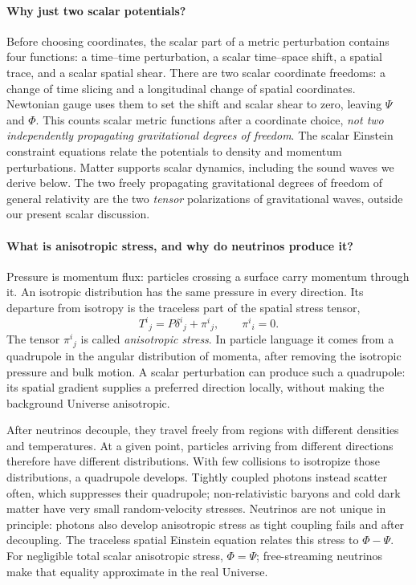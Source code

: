 \documentclass[12pt]{article}
\begin{document}
\paragraph{Why just two scalar potentials?}
Before choosing coordinates, the scalar part of a metric perturbation contains four
functions: a time--time perturbation, a scalar time--space shift, a spatial trace,
and a scalar spatial shear. There are two scalar coordinate freedoms: a change of
time slicing and a longitudinal change of spatial coordinates. Newtonian gauge uses
them to set the shift and scalar shear to zero, leaving $\Psi$ and $\Phi$.
This counts scalar metric functions after a coordinate choice, \emph{not two
independently propagating gravitational degrees of freedom}. The scalar Einstein
constraint equations relate the potentials to density and momentum perturbations.
Matter supports scalar dynamics, including the sound waves we derive below. The two
freely propagating gravitational degrees of freedom of general relativity are the
two \emph{tensor} polarizations of gravitational waves, outside our present scalar
discussion.

\paragraph{What is anisotropic stress, and why do neutrinos produce it?}
Pressure is momentum flux: particles crossing a surface carry momentum through it.
An isotropic distribution has the same pressure in every direction. Its departure
from isotropy is the traceless part of the spatial stress tensor,
\[
T^i{}_j=P\delta^i{}_j+\pi^i{}_j,\qquad \pi^i{}_i=0.
\]
The tensor $\pi^i{}_j$ is called \emph{anisotropic stress}. In particle language it
comes from a quadrupole in the angular distribution of momenta, after removing the
isotropic pressure and bulk motion. A scalar perturbation can produce such a
quadrupole: its spatial gradient supplies a preferred direction locally, without
making the background Universe anisotropic.

After neutrinos decouple, they travel freely from regions with different densities
and temperatures. At a given point, particles arriving from different directions
therefore have different distributions. With few collisions to isotropize those
distributions, a quadrupole develops. Tightly coupled photons instead scatter often,
which suppresses their quadrupole; non-relativistic baryons and cold dark matter
have very small random-velocity stresses. Neutrinos are not unique in principle:
photons also develop anisotropic stress as tight coupling fails and after decoupling.
The traceless spatial Einstein equation relates this stress to $\Phi-\Psi$.
For negligible total scalar anisotropic stress, $\Phi=\Psi$; free-streaming neutrinos
make that equality approximate in the real Universe.
\end{document}
